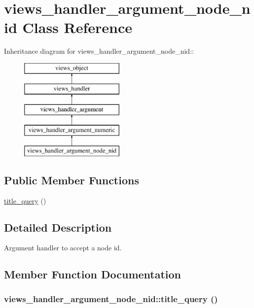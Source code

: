 \hypertarget{classviews__handler__argument__node__nid}{
\section{views\_\-handler\_\-argument\_\-node\_\-nid Class Reference}
\label{classviews__handler__argument__node__nid}
}
Inheritance diagram for views\_\-handler\_\-argument\_\-node\_\-nid::\begin{figure}[H]
\begin{center}
\leavevmode
\includegraphics[height=5cm]{classviews__handler__argument__node__nid}
\end{center}
\end{figure}
\subsection*{Public Member Functions}
\begin{CompactItemize}
\item 
\hyperlink{classviews__handler__argument__node__nid_7c448ef89d94d7b103a162128ee9bbf8}{title\_\-query} ()
\end{CompactItemize}


\subsection{Detailed Description}
Argument handler to accept a node id. 

\subsection{Member Function Documentation}
\hypertarget{classviews__handler__argument__node__nid_7c448ef89d94d7b103a162128ee9bbf8}{
\subsubsection[{title\_\-query}]{\setlength{\rightskip}{0pt plus 5cm}views\_\-handler\_\-argument\_\-node\_\-nid::title\_\-query ()}}
\label{classviews__handler__argument__node__nid_7c448ef89d94d7b103a162128ee9bbf8}


